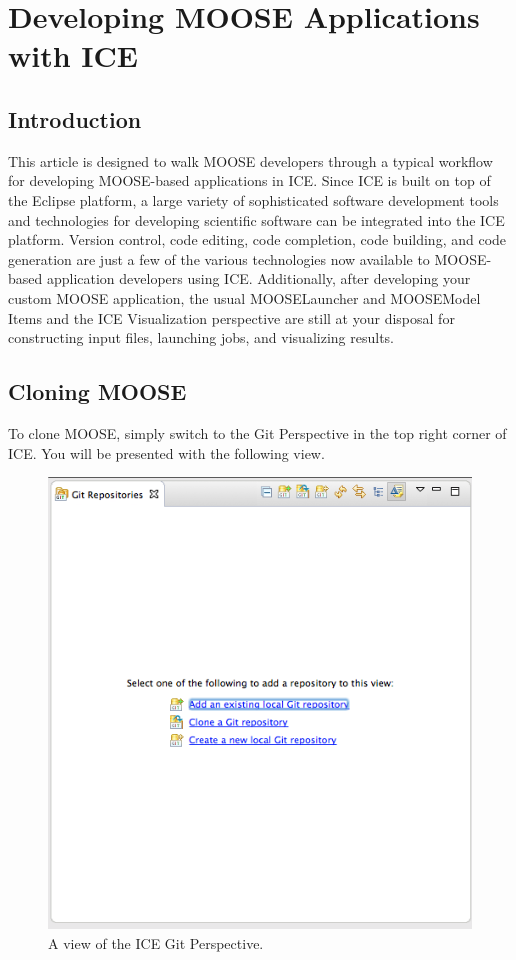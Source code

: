 \chapter{Developing MOOSE Applications with ICE}
\label{sec:devMoose}

\section{Introduction}\label{introduction}

This article is designed to walk MOOSE developers through a typical
workflow for developing MOOSE-based applications in ICE. Since ICE is
built on top of the Eclipse platform, a large variety of sophisticated
software development tools and technologies for developing scientific
software can be integrated into the ICE platform. Version control, code
editing, code completion, code building, and code generation are just a
few of the various technologies now available to MOOSE-based application
developers using ICE. Additionally, after developing your custom MOOSE
application, the usual MOOSELauncher and MOOSEModel Items and the ICE
Visualization perspective are still at your disposal for constructing
input files, launching jobs, and visualizing results.

\section{Cloning MOOSE}\label{cloning-moose}

To clone MOOSE, simply switch to the Git Perspective in the top right
corner of ICE. You will be presented with the following view.

\begin{figure}[htbp]
\centering
\includegraphics[width=\textwidth]{figures/GitView.png}
\caption{A view of the ICE Git Perspective.}
\end{figure}

